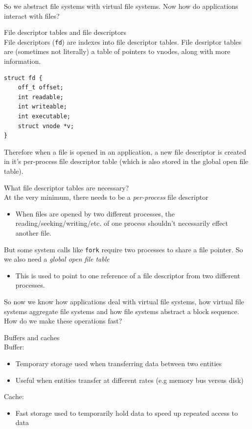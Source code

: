 \documentclass[journal, letterpaper]{IEEEtran}
\begin{document}
So we abstract file systems with virtual file systems. Now how do applications interact with files?
\begin{theory}{File descriptor tables and file descriptors} \\
    File descriptors (\verb|fd|) are indexes into file descriptor tables. File desriptor tables are (sometimes not literally) a table of pointers to vnodes, along with more information.
    \begin{verbatim}
struct fd {
    off_t offset;
    int readable;
    int writeable;
    int executable;
    struct vnode *v;
}
    \end{verbatim}
    Therefore when a file is opened in an application, a new file descriptor is created in it's per-process file descriptor table (which is also stored in the global open file table).
\end{theory}
\begin{aside}{What file descriptor tables are necessary?} \\
    At the very minimum, there needs to be a \textit{per-process} file descriptor
    \begin{itemize}
        \item When files are opened by two different processes, the reading/seeking/writing/etc. of one process shouldn't necessarily effect another file.
    \end{itemize}
    But some system calls like \verb|fork| require two processes to share a file pointer. So we also need a \textit{global open file table}
    \begin{itemize}
        \item This is used to point to one reference of a file descriptor from two different processes.
    \end{itemize}
\end{aside}
So now we know how applications deal with virtual file systems, how virtual file systems aggregate file systems and how file systems abstract a block sequence. How do we make these operations fast?
\begin{theory}{Buffers and caches} \\
    Buffer:
    \begin{itemize}
        \item Temporary storage used when transferring data between two entities
        \item Useful when entities transfer at different rates (e.g memory bus versus disk)
    \end{itemize}
    Cache:
    \begin{itemize}
        \item Fast storage used to temporarily hold data to speed up repeated access to data
    \end{itemize}
\end{theory}
\end{document}
